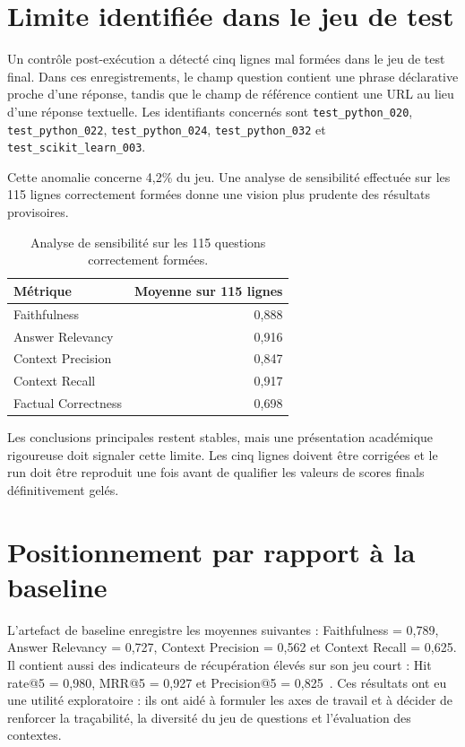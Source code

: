 \documentclass[12pt,a4paper,oneside]{report}
\begin{document}
\section{Limite identifiée dans le jeu de test}

Un contrôle post-exécution a détecté cinq lignes mal formées dans le jeu de test
final. Dans ces enregistrements, le champ question contient une phrase
déclarative proche d'une réponse, tandis que le champ de référence contient une
URL au lieu d'une réponse textuelle. Les identifiants concernés sont
\texttt{test\_python\_020}, \texttt{test\_python\_022},
\texttt{test\_python\_024}, \texttt{test\_python\_032} et
\texttt{test\_scikit\_learn\_003}.

Cette anomalie concerne 4,2\% du jeu. Une analyse de sensibilité effectuée sur
les 115 lignes correctement formées donne une vision plus prudente des résultats
provisoires.

\begin{table}[H]
\centering
\caption{Analyse de sensibilité sur les 115 questions correctement formées.}
\label{tab:sensibilite}
\begin{tabular}{lr}
\toprule
\textbf{Métrique} & \textbf{Moyenne sur 115 lignes}\\
\midrule
Faithfulness & 0,888\\
Answer Relevancy & 0,916\\
Context Precision & 0,847\\
Context Recall & 0,917\\
Factual Correctness & 0,698\\
\bottomrule
\end{tabular}
\end{table}

Les conclusions principales restent stables, mais une présentation académique
rigoureuse doit signaler cette limite. Les cinq lignes doivent être corrigées et
le run doit être reproduit une fois avant de qualifier les valeurs de scores
finals définitivement gelés.

\section{Positionnement par rapport à la baseline}

L'artefact de baseline enregistre les moyennes suivantes : Faithfulness = 0,789,
Answer Relevancy = 0,727, Context Precision = 0,562 et Context Recall = 0,625.
Il contient aussi des indicateurs de récupération élevés sur son jeu court :
Hit rate@5 = 0,980, MRR@5 = 0,927 et Precision@5 = 0,825~\cite{baselineArtifact}.
Ces résultats ont eu une utilité exploratoire : ils ont aidé à formuler les
axes de travail et à décider de renforcer la traçabilité, la diversité du jeu de
questions et l'évaluation des contextes.
\end{document}

